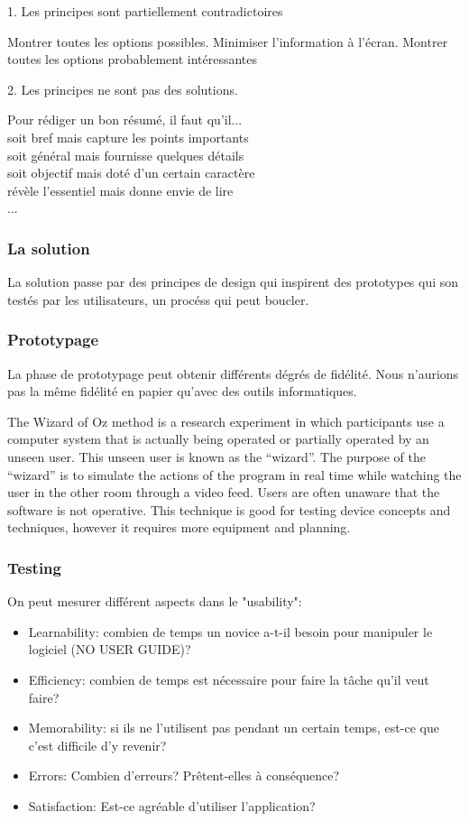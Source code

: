 1. Les principes sont partiellement contradictoires

Montrer toutes les options possibles.
Minimiser l'information \`a l'\'ecran.
Montrer toutes les options probablement int\'eressantes

2. Les principes ne sont pas des solutions.

Pour r\'ediger un bon r\'esum\'e, il faut qu'il...\\
soit bref mais capture les points importants\\
soit g\'en\'eral mais fournisse quelques d\'etails\\
soit objectif mais dot\'e d'un certain caract\`ere\\
r\'ev\`ele l'essentiel mais donne envie de lire\\
...

\subsubsection{La solution}

La solution passe par des principes de design qui inspirent des prototypes qui son test\'es par les utilisateurs, un proc\'ess qui peut boucler.

\subsubsection{Prototypage}

La phase de prototypage peut obtenir diff\'erents d\'egr\'es de fid\'elit\'e. Nous n'aurions pas la m\^eme fid\'elit\'e en papier qu'avec des outils informatiques. 

The Wizard of Oz method is a research experiment in which participants use a computer system that is actually being operated or partially operated by an unseen user. This unseen user is known as the “wizard”. The purpose of the “wizard” is to simulate the actions of the program in real time while watching the user in the other room through a video feed. Users are often unaware that the software is not operative. This technique is good for testing device concepts and techniques, however it requires more equipment and planning.

\subsubsection{Testing}

On peut mesurer diff\'erent aspects dans le "usability":

\begin{itemize}
\item Learnability: combien de temps un novice a-t-il besoin pour manipuler le logiciel (NO USER GUIDE)?
\item Efficiency: combien de temps est n\'ecessaire pour faire la t\^ache qu'il veut faire?
\item Memorability: si ils ne l'utilisent pas pendant un certain temps, est-ce que c'est difficile d'y revenir?
\item Errors: Combien d'erreurs? Pr\^etent-elles \`a cons\'equence?
\item Satisfaction: Est-ce agr\'eable d'utiliser l'application?
\end{itemize}

